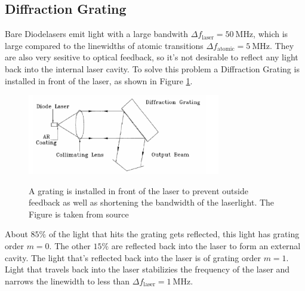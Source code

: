 \subsection{Diffraction Grating}
Bare Diodelasers emit light with a large bandwith $\Delta f_\text{laser} = \SI{50}{\mega\Hz}$, which is large compared to the linewidths of atomic transitions $\Delta f_\text{atomic} = \SI{5}{\mega\Hz}$.
They are also very sesitive to optical feedback, so it's not desirable to reflect any light back into the internal laser cavity.
To solve this problem a Diffraction Grating is installed in front of the laser, as shown in Figure \ref{fig:grating}.

\begin{figure}
    \centering
    \caption{A grating is installed in front of the laser to prevent outside feedback as well as shortening the bandwidth of the laserlight. The Figure is taken from source \cite[5]{anleitung_laser}}
    \includegraphics[width=0.75\textwidth]{content/data/grating.png}
    \label{fig:grating}
\end{figure}

About $85\%$ of the light that hits the grating gets reflected, this light has grating order $m=0$.
The other $15\%$ are reflected back into the laser to form an external cavity.
The light that's reflected back into the laser is of grating order $m=1$.
Light that travels back into the laser stabilizies the frequency of the laser and narrows the linewidth to less than $\Delta f_\text{laser} = \SI{1}{\mega\Hz}$.


